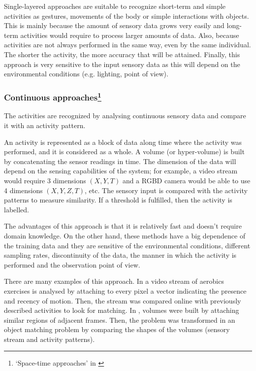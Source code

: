 Single-layered approaches are suitable to recognize short-term and simple activities as gestures, movements of the body or simple interactions with objects. 
This is mainly because the amount of sensory data grows very easily and long-term activities would require to process larger amounts of data. 
Also, because activities are not always performed in the same way, even by the same individual.
The shorter the activity, the more accuracy that will be attained.
Finally, this approach is very sensitive to the input sensory data as this will depend on the environmental conditions (e.g. lighting, point of view).


\subsubsection{Continuous approaches\footnote{`Space-time approaches' in \citep{Aggarwal11_HumanActivity}}} %

The activities are recognized by analysing continuous sensory data and compare it with an activity pattern.

An activity is represented as a block of data along time where the activity was performed, and it is considered as a whole.
A volume (or hyper-volume) is built by concatenating the sensor readings in time.
The dimension of the data will depend on the sensing capabilities of the system; for example, a video stream would require 3 dimensions $(X,Y,T)$ and a RGBD camera would be able to use 4 dimensions $(X,Y,Z,T)$, etc. %
The sensory input is compared with the activity patterns to measure similarity.
If a threshold is fulfilled, then the activity is labelled.

The advantages of this approach is that it is relatively fast and doesn't require domain knowledge.
On the other hand, these methods have a big dependence of the training data and they are sensitive of the environmental conditions, different sampling rates, discontinuity of the data, the manner in which the activity is performed and the observation point of view. %

There are many examples of this approach.
In \citep{Bobick2001_RecHuMovTemp} a video stream of aerobics exercises is analysed by attaching to every pixel a vector indicating the presence and recency of motion. 
Then, the stream was compared online with previously described activities to look for matching. 
In \citep{Ke2007_SpTmpShapeAR}, volumes were built by attaching similar regions of adjacent frames.
Then, the problem was transformed in an object matching problem by comparing the shapes of the volumes (sensory stream and activity patterns).


